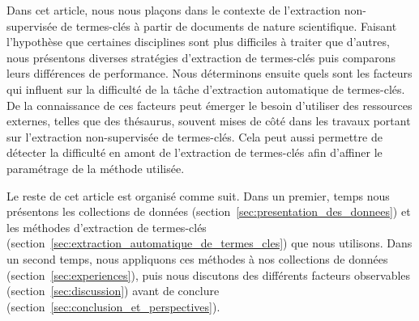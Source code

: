   Dans cet article, nous nous plaçons dans le contexte de l'extraction
  non-supervisée de termes-clés à partir de documents de nature scientifique.
  Faisant l'hypothèse que certaines disciplines sont plus difficiles à traiter
  que d'autres, nous présentons diverses stratégies d'extraction de termes-clés
  puis comparons leurs différences de performance. Nous déterminons ensuite
  quels sont les facteurs qui influent sur la difficulté de la tâche
  d'extraction automatique de termes-clés. De la connaissance de ces facteurs
  peut émerger le besoin d'utiliser des ressources externes, telles que des
  thésaurus, souvent mises de côté dans les travaux portant sur l'extraction
  non-supervisée de termes-clés. Cela peut aussi permettre de détecter la
  difficulté en amont de l'extraction de termes-clés afin d'affiner le
  paramétrage de la méthode utilisée.

  Le reste de cet article est organisé comme suit. Dans un premier, temps nous
  présentons les collections de données
  (section~\ref{sec:presentation_des_donnees}) et les méthodes d'extraction de
  termes-clés (section~\ref{sec:extraction_automatique_de_termes_cles}) que nous
  utilisons. Dans un second temps, nous appliquons ces méthodes à nos
  collections de données (section~\ref{sec:experiences}), puis nous discutons
  des différents facteurs observables (section~\ref{sec:discussion}) avant de
  conclure (section~\ref{sec:conclusion_et_perspectives}).

